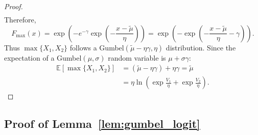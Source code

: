 \documentclass[12pt]{article}
\theoremstyle{plain}
\begin{document}
\begin{proof}
\begin{align*}
	\end{align*}
	Therefore,
	\begin{equation*}
		F_{\max}(x) = \exp\left(-e^{-\gamma}\exp\left(-\frac{x - \tilde{\mu}}{\eta}\right)\right) = \exp\left(-\exp\left(-\frac{x - \tilde{\mu}}{\eta} - \gamma\right)\right).
	\end{equation*}
	Thus $\max\{X_1, X_2\}$ follows a Gumbel$(\tilde{\mu} - \eta\gamma, \eta)$
	distribution. Since the expectation of a Gumbel$(\mu, \sigma)$ random variable
	is $\mu + \sigma\gamma$:
	\begin{align*}
		\mathbb{E}[\max\{X_1, X_2\}] & = (\tilde{\mu} - \eta\gamma) + \eta\gamma = \tilde{\mu}             \\
		                             & = \eta \ln\left(\exp\frac{V_1}{\eta} + \exp\frac{V_2}{\eta}\right).
	\end{align*}
\end{proof}

\subsection{Proof of Lemma~\ref{lem:gumbel_logit}}\label{app:proof_gumbel_logit}
\end{document}
